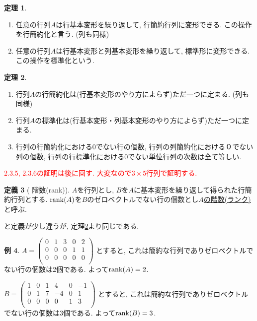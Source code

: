 \documentclass[dvipdfmx,a4paper,11pt]{article} %
\newcommand{\xr}[1]{\textcolor{red}{#1}}
\theoremstyle{definition}
\newtheorem{thm}{定理}
\newtheorem{dfn}[thm]{定義}
\newtheorem{exa}[thm]{例}
\begin{document}
    \begin{thm}\cite[定理 2.3.5]{O}
    \label{thm-kanyakuka}
    \begin{enumerate}
    \item 任意の行列$A$は行基本変形を繰り返して, 行簡約行列に変形できる. この操作を行簡約化と言う. (列も同様)
\item 任意の行列$A$は行基本変形と列基本変形を繰り返して, 標準形に変形できる. この操作を標準化という. 
    \end{enumerate}
   \end{thm}

\begin{thm}\cite[定理 2.3.6]{O}
    \label{thm-kanyakuka-unique}
\begin{enumerate}
\item 行列$A$の行簡約化は(行基本変形のやり方によらず)ただ一つに定まる. (列も同様)
\item 行列$A$の標準化は(行基本変形・列基本変形のやり方によらず)ただ一つに定まる.
\item 行列の行簡約化における0でない行の個数, 行列の列簡約化における０でない列の個数, 行列の行標準化における0でない単位行列の次数は全て等しい. 
\end{enumerate}
\end{thm}

\xr{2.3.5, 2.3.6の証明は後に回す. 大変なので$3 \times 5$行列で証明する.}
 
 
    \begin{dfn}[{\cite[定義 2.3.7]{O} 階数(rank)}]
   \label{dfn-rank}
$A$を行列とし, $B$を$A$に基本変形を繰り返して得られた行簡約行列とする. 
${\rm rank}(A)$を$B$のゼロベクトルでない行の個数とし\underline{$A$の階数(ランク)}と呼ぶ.
   \end{dfn}
 \cite[定義 2.3.7]{O}と定義が少し違うが, 定理\ref{thm-kanyakuka-unique}より同じである. 
 
\begin{exa}
$A=
 \begin{pmatrix}
 0& 1& 3  & 0&2\\
 0& 0& 0  & 1&1\\
 0& 0& 0 & 0&0\\
 \end{pmatrix}
 $
 とすると, これは簡約な行列でありゼロベクトルでない行の個数は2個である. よって${\rm rank}(A)=2$.
 
 $B= \begin{pmatrix}
 1& 0& 1  & 4&0&-1\\
 0& 1& 7 & -4&0&1\\
 0& 0& 0 & 0&1&3\\
 \end{pmatrix}
 $ とすると, これは簡約な行列でありゼロベクトルでない行の個数は3個である. よって${\rm rank}(B)=3$.
\end{exa}
\end{document}

